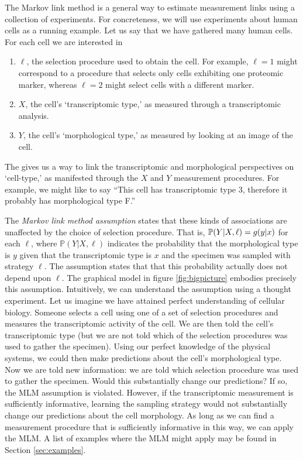 The Markov link method is a general way to estimate measurement links using a collection of experiments.  For concreteness, we will use experiments about human cells as a running example.  Let us say that we have gathered many human cells.  For each cell we are interested in 
%
\begin{enumerate}
    \item $\ell$, the selection procedure used to obtain the cell.  For example, $\ell=1$ might correspond to a procedure that selects only cells exhibiting one proteomic marker, whereas $\ell=2$ might select cells with a different marker.
    \item $X$, the cell's `transcriptomic type,' as measured through a transcriptomic analysis.  
    \item $Y$, the cell's `morphological type,' as measured by looking at an image of the cell.
\end{enumerate}
%
The \MLM{} gives us a way to link the transcriptomic and morphological perspectives on `cell-type,' as manifested through the $X$ and $Y$ measurement procedures.  For example, we might like to say ``This cell has transcriptomic type 3, therefore it probably has morphological type F.''  

The \emph{Markov link method assumption} states that these kinds of associations are unaffected by the choice of selection procedure.  That is, $\mathbb{P}(Y|X,\ell)=g(y|x)$ for each $\ell$, where $\mathbb{P}(Y|X,\ell)$ indicates the probability that the morphological type is $y$ given that the transcriptomic type is $x$ and the specimen was sampled with strategy $\ell$.  The assumption states that that this probability actually does not depend upon $\ell$.  The graphical model in figure \ref{fig:bigpicture} embodies precisely this assumption.  Intuitively, we can understand the assumption using a thought experiment.  Let us imagine we have attained perfect understanding of cellular biology.  Someone selects a cell using one of a set of selection procedures and measures the transcriptomic activity of the cell.  We are then told the cell's transcriptomic type (but we are not told which of the selection procedures was used to gather the specimen).  Using our perfect knowledge of the physical systems, we could then make predictions about the cell's morphological type.  Now we are told new information: we are told which selection procedure was used to gather the specimen.  Would this substantially change our predictions?  If so, the MLM assumption is violated.  However, if the transcriptomic measurement is sufficiently informative, learning the sampling strategy would not substantially change our predictions about the cell morphology.  As long as we can find a measurement procedure that is sufficiently informative in this way, we can apply the MLM.  A list of examples where the MLM might apply may be found in Section \ref{sec:examples}.

